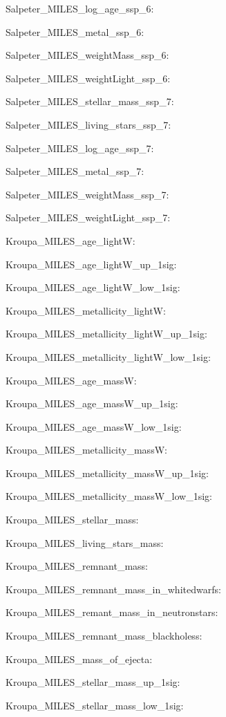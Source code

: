 \item Salpeter\_MILES\_log\_age\_ssp\_6: 
\item Salpeter\_MILES\_metal\_ssp\_6: 
\item Salpeter\_MILES\_weightMass\_ssp\_6: 
\item Salpeter\_MILES\_weightLight\_ssp\_6: 
\item Salpeter\_MILES\_stellar\_mass\_ssp\_7: 
\item Salpeter\_MILES\_living\_stars\_ssp\_7: 
\item Salpeter\_MILES\_log\_age\_ssp\_7: 
\item Salpeter\_MILES\_metal\_ssp\_7: 
\item Salpeter\_MILES\_weightMass\_ssp\_7: 
\item Salpeter\_MILES\_weightLight\_ssp\_7: 
\item Kroupa\_MILES\_age\_lightW: 
\item Kroupa\_MILES\_age\_lightW\_up\_1sig: 
\item Kroupa\_MILES\_age\_lightW\_low\_1sig: 
\item Kroupa\_MILES\_metallicity\_lightW: 
\item Kroupa\_MILES\_metallicity\_lightW\_up\_1sig: 
\item Kroupa\_MILES\_metallicity\_lightW\_low\_1sig: 
\item Kroupa\_MILES\_age\_massW: 
\item Kroupa\_MILES\_age\_massW\_up\_1sig: 
\item Kroupa\_MILES\_age\_massW\_low\_1sig: 
\item Kroupa\_MILES\_metallicity\_massW: 
\item Kroupa\_MILES\_metallicity\_massW\_up\_1sig: 
\item Kroupa\_MILES\_metallicity\_massW\_low\_1sig: 
\item Kroupa\_MILES\_stellar\_mass: 
\item Kroupa\_MILES\_living\_stars\_mass: 
\item Kroupa\_MILES\_remnant\_mass: 
\item Kroupa\_MILES\_remnant\_mass\_in\_whitedwarfs: 
\item Kroupa\_MILES\_remant\_mass\_in\_neutronstars: 
\item Kroupa\_MILES\_remnant\_mass\_blackholess: 
\item Kroupa\_MILES\_mass\_of\_ejecta: 
\item Kroupa\_MILES\_stellar\_mass\_up\_1sig: 
\item Kroupa\_MILES\_stellar\_mass\_low\_1sig: 

